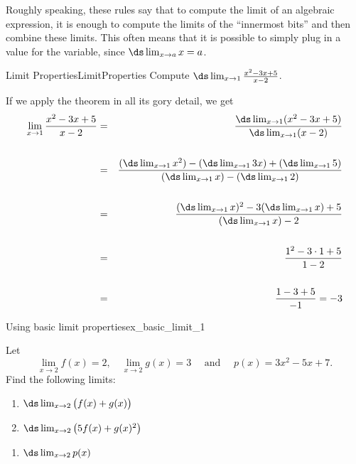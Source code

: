 Roughly speaking, these rules say that to compute the limit of an algebraic expression, it is enough to compute the limits of the ``innermost bits'' and then combine these limits. This often means that it is possible to simply plug in a value for the variable, since
$\ds \lim_{x\to a} x =a$.

\begin{example}{Limit Properties}{LimitProperties}
Compute $\ds\lim_{x\to 1}{x^2-3x+5\over x-2}$.
\end{example}

\begin{solution} 
 If we apply the theorem in all its gory detail, we get
\begin{eqnarray*}
\lim_{x\to 1}{x^2-3x+5\over x-2}&=&
{\ds\lim_{x\to 1}(x^2-3x+5)\over \ds\lim_{x\to1}(x-2)}\cr
\\
&=&{(\ds\lim_{x\to 1}x^2)-(\ds\lim_{x\to1}3x)+(\ds\lim_{x\to1}5)\over 
  (\ds\lim_{x\to1}x)-(\ds\lim_{x\to1}2)}\cr
\\
&=&{(\ds\lim_{x\to 1}x)^2-3(\ds\lim_{x\to1}x)+5\over (\ds\lim_{x\to1}x)-2}\cr
\\
&=&{1^2-3\cdot1+5\over 1-2}\cr
\\
&=&{1-3+5\over -1} = -3
\end{eqnarray*}
\end{solution}
 


\begin{example}{Using basic limit properties}{ex_basic_limit_1}{
Let $$\lim_{x\to 2} f(x)=2,\quad\lim_{x\to 2} g(x) = 3\quad \text{\ and \ }\quad p(x) = 3x^2-5x+7.$$ Find the following limits:

\noindent\begin{minipage}[t]{.5\textwidth}
\begin{enumerate}
\item		$\ds \lim_{x\to 2} \big(f(x) + g(x)\big)$
\item		$\ds \lim_{x\to 2} \big(5f(x) + g(x)^2\big)$
\end{enumerate}
\end{minipage}
\begin{minipage}[t]{.5\textwidth}
\begin{enumerate}\addtocounter{enumi}{2}
\item		$\ds \lim_{x\to 2} p(x)$
\end{enumerate}
\end{minipage}}
\end{example}


